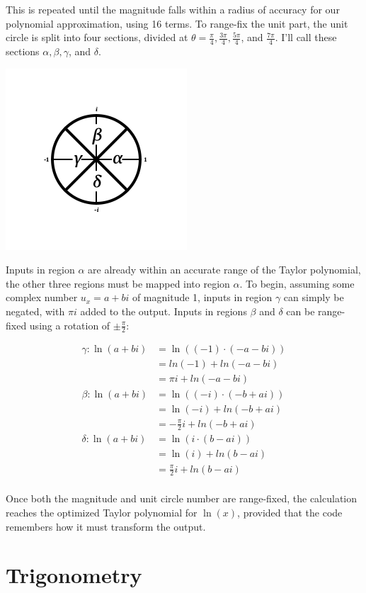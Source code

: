 \documentclass[10pt]{article}
\begin{document}
\begin{multicols}{2}
This is repeated until the magnitude falls within a radius of accuracy for our polynomial approximation, using 16 terms. To range-fix the unit part, the unit circle is split into four sections, divided at $θ = \frac{π}{4}, \frac{3π}{4}, \frac{5π}{4}$, and $\frac{7π}{4}$. I'll call these sections $α, β, γ$, and $δ$.

\includegraphics{../graphic/ln-rf-diagram.png}

Inputs in region $α$ are already within an accurate range of the Taylor polynomial, the other three regions must be mapped into region $α$. To begin, assuming some complex number $u_x = a + bi$ of magnitude 1, inputs in region $γ$ can simply be negated, with $πi$ added to the output. Inputs in regions $β$ and $δ$ can be range-fixed using a rotation of $±\frac{π}{2}$:

\begin{align*}
    γ: \ln(a+bi) &= \ln((-1) · (-a-bi)) \\
    &= ln(-1) + ln(-a-bi) \\
    &= πi + ln(-a-bi) \\
    β: \ln(a+bi) &= \ln((-i) · (-b+ai)) \\
    &= \ln(-i) + ln(-b+ai) \\
    &= -\frac{π}{2}i + ln(-b+ai) \\
    δ: \ln(a+bi) &= \ln(i · (b-ai)) \\
    &= \ln(i) + ln(b-ai) \\
    &= \frac{π}{2}i + ln(b-ai) \\
\end{align*}

Once both the magnitude and unit circle number are range-fixed, the calculation reaches the optimized Taylor polynomial for $\ln(x)$, provided that the code remembers how it must transform the output.

\section{Trigonometry}


\end{multicols}
\end{document}
